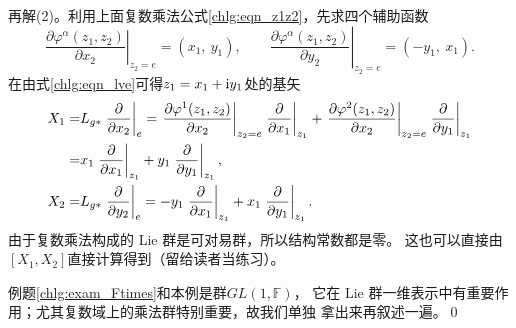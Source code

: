 再解(2)。利用上面复数乘法公式\eqref{chlg:eqn_z1z2}，先求四个辅助函数
\begin{equation}
    \left. \frac{\partial \varphi^\alpha (z_1,z_2)}{\partial x_2} \right|_{z_2=e} = (x_1,\ y_1) ,\qquad
    \left. \frac{\partial \varphi^\alpha (z_1,z_2)}{\partial y_2} \right|_{z_2=e} = (-y_1,\ x_1) .
\end{equation}
在由式\eqref{chlg:eqn_lve}可得$z_1=x_1+\mathrm{i} y_1$处的基矢
\begin{align}
    X_1=&L_{g*} \left.\frac{\partial }{\partial x_2}\right|_{e} =
    \left. \frac{\partial \varphi^1 (z_1,z_2)}{\partial x_2}
    \right|_{z_2=e}   \left. \frac{\partial}{\partial x_1}\right|_{z_1} +
    \left. \frac{\partial \varphi^2 (z_1,z_2)}{\partial x_2}
    \right|_{z_2=e}   \left. \frac{\partial}{\partial y_1}\right|_{z_1} \notag \\
    =& x_1\left. \frac{\partial}{\partial x_1}\right|_{z_1}+ y_1\left. \frac{\partial}{\partial y_1}\right|_{z_1}, \\
    X_2=&L_{g*} \left.\frac{\partial }{\partial y_2} \right|_{e}=
       -y_1\left. \frac{\partial}{\partial x_1}\right|_{z_1}+ x_1\left. \frac{\partial}{\partial y_1}\right|_{z_1} .
\end{align}
由于复数乘法构成的 Lie 群是可对易群，所以结构常数都是零。
这也可以直接由$[X_1,X_2]$直接计算得到（留给读者当练习）。

例题\ref{chlg:exam_Ftimes}和本例是群$GL(1,\mathbb{F})$，
它在 Lie 群一维表示中有重要作用；尤其复数域上的乘法群特别重要，故我们单独
拿出来再叙述一遍。\qed

